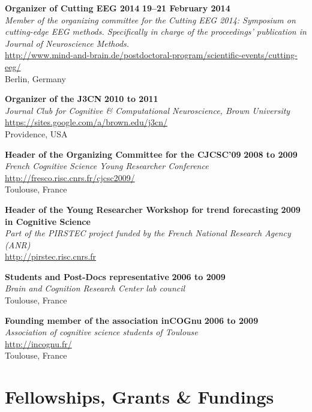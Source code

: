 \documentclass[margin,line]{resume}
\begin{document}
\begin{resume}
	\textbf{Organizer of Cutting EEG 2014} \hfill \textbf{19–21 February 2014}\\
	\textsl{Member of the organizing committee for the Cutting EEG 2014: Symposium on cutting-edge EEG methods. Specifically in charge of the proceedings' publication in Journal of Neuroscience Methods.}\\
	 \url{http://www.mind-and-brain.de/postdoctoral-program/scientific-events/cutting-eeg/}\\
	Berlin, Germany
	
	\textbf{Organizer of the J3CN} \hfill \textbf{2010 to 2011}\\
	\textsl{Journal Club for Cognitive \& Computational Neuroscience, Brown University}\\
	 \url{https://sites.google.com/a/brown.edu/j3cn/}\\
	Providence, USA	

	\textbf{Header of the Organizing Committee for the CJCSC'09} \hfill \textbf{2008 to 2009}\\
	\textsl{French Cognitive Science Young Researcher Conference}\\
	 \url{http://fresco.risc.cnrs.fr/cjcsc2009/}\\
	Toulouse, France		

	\textbf{Header of the Young Researcher Workshop for trend forecasting} \hfill \textbf{2009}\\
	 \textbf{in Cognitive Science}\\
	\textsl{Part of the PIRSTEC project funded by the French National Research Agency (ANR)}\\
	 \url{http://pirstec.risc.cnrs.fr}

	\textbf{Students and Post-Docs representative} \hfill \textbf{2006 to 2009}\\
	\textsl{Brain and Cognition Research Center lab council}\\
	Toulouse, France	

	\textbf{Founding member of the association inCOGnu} \hfill \textbf{2006 to 2009}\\
	\textsl{Association of cognitive science students of Toulouse}\\
	 \url{http://incognu.fr/}\\
	Toulouse, France


	\vspace{3mm}
	\section{\mysidestyle Fellowships, Grants \& Fundings}


\end{resume}
\end{document}
